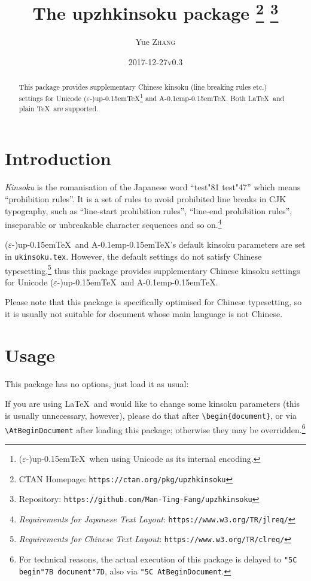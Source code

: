 \documentclass[a4paper]{article}
\newcommand\NormalSans{\normalfont\sffamily}
\newcommand\pkg[1]{{\protect\NormalSans#1}}
\newcommand\pTeX{p\kern-0.15em\TeX}
\newcommand\e{\ensuremath{\varepsilon}}
\newcommand\upTeX{u\pTeX}
\newcommand\ApTeX{A\kern-0.1em\pTeX}
\newcommand\kn{test}
\newcommand\sk{test}
\begin{document}
\title{The \pkg{upzhkinsoku} package%
  \thanks{CTAN Homepage: \texttt{https://ctan.org/pkg/upzhkinsoku}}
  \thanks{Repository: \texttt{https://github.com/Man-Ting-Fang/upzhkinsoku}}}
\author{Yue \textsc{Zhang}}
\date{2017-12-27\quad v0.3}

\maketitle

\begin{abstract}
This package provides supplementary Chinese kinsoku (line breaking rules etc.)
settings for Unicode (\e-)\upTeX\footnote{(\e-)\upTeX\ when using Unicode as its
internal encoding.} and \ApTeX. Both \LaTeX\ and plain \TeX\ are supported.
\end{abstract}

\section{Introduction}

\textit{Kinsoku} is the romanisation of the Japanese word ``{\kn\char"81\relax
\sk\char"47}'' which means ``prohibition rules''. It is a set of rules to avoid
prohibited line breaks in CJK typography, such as ``line-start prohibition
rules'', ``line-end prohibition rules'', inseparable or unbreakable character
sequences and so on.\footnote{\textit{Requirements for Japanese Text Layout}:
\texttt{https://www.w3.org/TR/jlreq/}}

(\e-)\upTeX\ and \ApTeX's default kinsoku parameters are set in
\verb|ukinsoku.tex|. However, the default settings do not satisfy Chinese
typesetting,\footnote{\textit{Requirements for Chinese Text Layout}:
\texttt{https://www.w3.org/TR/clreq/}} thus this package provides supplementary
Chinese kinsoku settings for Unicode (\e-)\upTeX\ and \ApTeX.

Please note that this package is specifically optimised for Chinese typesetting,
so it is usually not suitable for document whose main language is not Chinese.

\section{Usage}

This package has no options, just load it as usual:
If you are using \LaTeX\ and would like to change some kinsoku parameters (this
is usually unnecessary, however), please do that after \verb|\begin{document}|,
or via \verb|\AtBeginDocument| after loading this package; otherwise they may be
overridden.\footnote{For technical reasons, the actual execution of this package
is delayed to \texttt{\char"5C begin\char"7B document\char"7D}, also via
\texttt{\char"5C AtBeginDocument}.}
\end{document}

